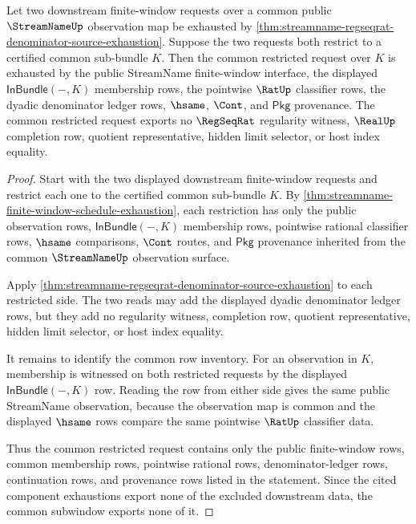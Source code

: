 \begin{theorem}
\label{thm:streamname-regseqrat-window-intersection-exhaustion}
Let two downstream finite-window requests over a common public
$\StreamNameUp$ observation map be exhausted by
\autoref{thm:streamname-regseqrat-denominator-source-exhaustion}. Suppose the
two requests both restrict to a certified common sub-bundle $K$. Then the
common restricted request over $K$ is exhausted by the public StreamName
finite-window interface, the displayed $\mathsf{InBundle}(-,K)$ membership
rows, the pointwise $\RatUp$ classifier rows, the dyadic denominator ledger
rows, $\hsame$, $\Cont$, and $\mathsf{Pkg}$ provenance. The common restricted
request exports no $\RegSeqRat$ regularity witness, $\RealUp$ completion row,
quotient representative, hidden limit selector, or host index equality.
\end{theorem}
\begin{proof}
Start with the two displayed downstream finite-window requests and restrict
each one to the certified common sub-bundle $K$. By
\autoref{thm:streamname-finite-window-schedule-exhaustion}, each restriction
has only the public observation rows, $\mathsf{InBundle}(-,K)$ membership
rows, pointwise rational classifier rows, $\hsame$ comparisons, $\Cont$
routes, and $\mathsf{Pkg}$ provenance inherited from the common
$\StreamNameUp$ observation surface.

Apply \autoref{thm:streamname-regseqrat-denominator-source-exhaustion} to
each restricted side. The two reads may add the displayed dyadic denominator
ledger rows, but they add no regularity witness, completion row, quotient
representative, hidden limit selector, or host index equality.

It remains to identify the common row inventory. For an observation in $K$,
membership is witnessed on both restricted requests by the displayed
$\mathsf{InBundle}(-,K)$ row. Reading the row from either side gives the same
public StreamName observation, because the observation map is common and the
displayed $\hsame$ rows compare the same pointwise $\RatUp$ classifier data.

Thus the common restricted request contains only the public finite-window
rows, common membership rows, pointwise rational rows, denominator-ledger
rows, continuation rows, and provenance rows listed in the statement. Since
the cited component exhaustions export none of the excluded downstream data,
the common subwindow exports none of it.
\end{proof}

